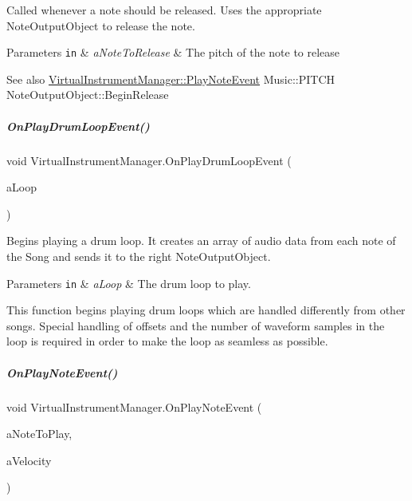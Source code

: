 Called whenever a note should be released. Uses the appropriate Note\+Output\+Object to release the note. 


\begin{DoxyParams}[1]{Parameters}
\mbox{\tt in}  & {\em a\+Note\+To\+Release} & The pitch of the note to release\\
\hline
\end{DoxyParams}
\begin{DoxySeeAlso}{See also}
\hyperlink{group___virtual_instrument_manager_class_virtual_instrument_manager_1_1_play_note_event}{Virtual\+Instrument\+Manager\+::\+Play\+Note\+Event} Music\+::\+P\+I\+T\+CH Note\+Output\+Object\+::\+Begin\+Release 
\end{DoxySeeAlso}
\mbox{\label{group___virtual_instrument_manager_ae2e2010b9a36ae2409466181ae0b9679}} 
\subparagraph{\texorpdfstring{On\+Play\+Drum\+Loop\+Event()}{OnPlayDrumLoopEvent()}}
{\footnotesize\ttfamily void Virtual\+Instrument\+Manager.\+On\+Play\+Drum\+Loop\+Event (\begin{DoxyParamCaption}\item[{Song}]{a\+Loop }\end{DoxyParamCaption})}



Begins playing a drum loop. It creates an array of audio data from each note of the Song and sends it to the right Note\+Output\+Object. 


\begin{DoxyParams}[1]{Parameters}
\mbox{\tt in}  & {\em a\+Loop} & The drum loop to play.\\
\hline
\end{DoxyParams}
This function begins playing drum loops which are handled differently from other songs. Special handling of offsets and the number of waveform samples in the loop is required in order to make the loop as seamless as possible. \mbox{\label{group___virtual_instrument_manager_a80b3821df3b1488a150f6062638f105c}} 
\subparagraph{\texorpdfstring{On\+Play\+Note\+Event()}{OnPlayNoteEvent()}}
{\footnotesize\ttfamily void Virtual\+Instrument\+Manager.\+On\+Play\+Note\+Event (\begin{DoxyParamCaption}\item[{Music.\+P\+I\+T\+CH}]{a\+Note\+To\+Play,  }\item[{int}]{a\+Velocity }\end{DoxyParamCaption})}



